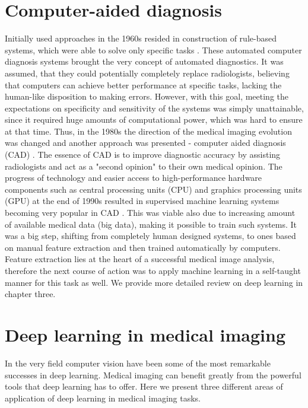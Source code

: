 \section{Computer-aided diagnosis}
Initially used approaches in the 1960s resided in construction of rule-based systems, which were able to solve only specific tasks \cite{surveyOnImageing}. These automated computer diagnosis systems brought the very concept of automated diagnostics. It was assumed, that they could potentially completely replace radiologists, believing that computers can achieve better performance at specific tasks, lacking the human-like disposition to making errors. However, with this goal, meeting the expectations on specificity and sensitivity of the systems was simply unattainable, since it required huge amounts of computational power, which was hard to ensure at that time. Thus, in the 1980s the direction of the medical imaging evolution was changed and another approach was presented - computer aided diagnosis (CAD) \cite{diagnostic50years}. The essence of CAD is to improve diagnostic accuracy by assisting radiologists and act as a "second opinion" \cite{surveyOnImageing, CADinmedicalImaging} to their own medical opinion. 
The progress of technology and easier access to high-performance hardware components such as central processing units (CPU) and graphics processing units (GPU) at the end of 1990s resulted in supervised machine learning systems becoming very popular in CAD \cite{surveyOnImageing}. This was viable also due to increasing amount of available medical data (big data), making it possible to train such systems. It was a big step, shifting from completely human designed systems, to ones based on manual feature extraction and then trained automatically by computers. Feature extraction lies at the heart of a successful medical image analysis, therefore the next course of action was to apply machine learning in a self-taught manner for this task as well. We provide more detailed review on deep learning in chapter three.
\section{Deep learning in medical imaging}
In the very field computer vision have been some of the most remarkable successes in deep learning. Medical imaging can benefit greatly from the powerful tools that deep learning has to offer. Here we present three different areas of application of deep learning in medical imaging tasks.
